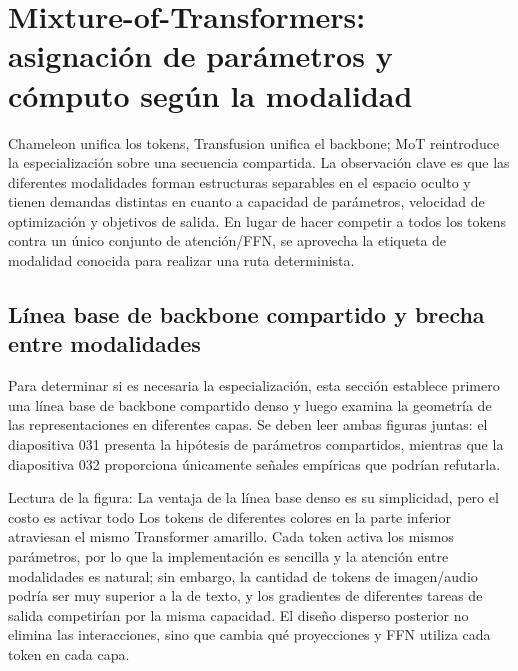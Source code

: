 \section{Mixture-of-Transformers: asignación de parámetros y cómputo según la modalidad}

Chameleon unifica los tokens, Transfusion unifica el backbone; MoT reintroduce la especialización sobre una secuencia compartida. La observación clave es que las diferentes modalidades forman estructuras separables en el espacio oculto y tienen demandas distintas en cuanto a capacidad de parámetros, velocidad de optimización y objetivos de salida. En lugar de hacer competir a todos los tokens contra un único conjunto de atención/FFN, se aprovecha la etiqueta de modalidad conocida para realizar una ruta determinista.

\subsection{Línea base de backbone compartido y brecha entre modalidades}

Para determinar si es necesaria la especialización, esta sección establece primero una línea base de backbone compartido denso y luego examina la geometría de las representaciones en diferentes capas. Se deben leer ambas figuras juntas: el diapositiva 031 presenta la hipótesis de parámetros compartidos, mientras que la diapositiva 032 proporciona únicamente señales empíricas que podrían refutarla.


\begin{knowledgebox}{Lectura de la figura: La ventaja de la línea base denso es su simplicidad, pero el costo es activar todo}
Los tokens de diferentes colores en la parte inferior atraviesan el mismo Transformer amarillo. Cada token activa los mismos parámetros, por lo que la implementación es sencilla y la atención entre modalidades es natural; sin embargo, la cantidad de tokens de imagen/audio podría ser muy superior a la de texto, y los gradientes de diferentes tareas de salida competirían por la misma capacidad. El diseño disperso posterior no elimina las interacciones, sino que cambia qué proyecciones y FFN utiliza cada token en cada capa.
\end{knowledgebox}


